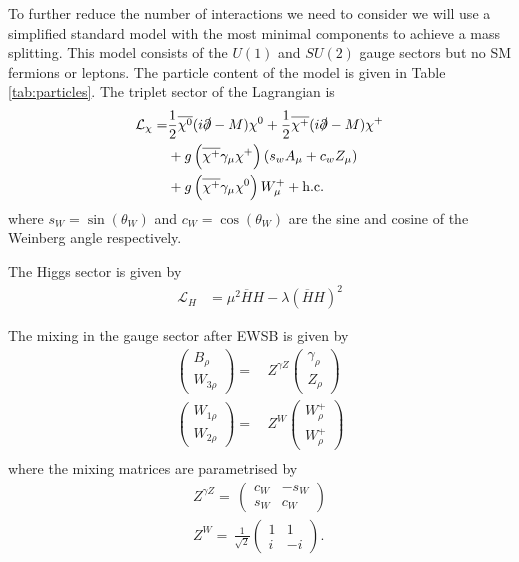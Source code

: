 \documentclass[11pt]{article}
\newcommand{\mychi}{\raisebox{0pt}[1ex][1ex]{$\chi$}}
\begin{document}
To further reduce the number of interactions we need to consider we will use a simplified standard model with the most minimal components to achieve a mass splitting.  This model consists of the $U(1)$ and $SU(2)$ gauge sectors but no SM fermions or leptons.  The particle content of the model is given in Table \ref{tab:particles}.  The triplet sector of the Lagrangian is
\begin{align}
\begin{split}
\mathcal{L}_{\chi}=&\frac{1}{2}\overline{\mychi^0}(i\slashed{\partial}-M)\mychi^0+\frac{1}{2}\overline{\mychi^+}(i\slashed{\partial}-M)\mychi^{+}\\
&+g\left(\overline{\mychi^+}\gamma_{\mu}\mychi^+\right)\left(s_wA_{\mu}+c_wZ_{\mu}\right)\\
&+g\left(\overline{\mychi^+}\gamma_{\mu}\mychi^0 \right)W_{\mu}^++\text{h.c.}
\end{split}
\end{align}
where $s_W=\sin(\theta_W)$ and $c_W=\cos(\theta_W)$ are the sine and cosine of the Weinberg angle respectively.

The Higgs sector is given by
\begin{align}
\mathcal{L}_{H}&=\mu^2 \overline{H}H-\lambda(\overline{H}H)^2
\end{align}

The mixing in the gauge sector after EWSB is given by
\begin{align} 
\left(\begin{array}{c} 
B_{{\rho}}\\ 
W_{{3 \rho}}\end{array} \right) 
 = & \,Z^{\gamma Z}
\left(\begin{array}{c} 
\gamma_{{\rho}}\\ 
Z_{{\rho}}\end{array} \right) \\ 
\left(\begin{array}{c} 
W_{{1 \rho}}\\ 
W_{{2 \rho}}\end{array} \right) 
 = & \,Z^{W}
\left(\begin{array}{c} 
W^+_{{\rho}}\\ 
W^+_{{\rho}}\end{array} \right) \\ 
\end{align} 
where the mixing matrices are parametrised by \\ 
\begin{align} 
Z^{\gamma Z}= \, \left( 
\begin{array}{cc} 
c_W  & - s_W   \\ 
 s_W  & c_W \end{array} 
\right) \\ 
Z^{W}= \,\frac{1}{\sqrt{2}}  \left( 
\begin{array}{cc} 
1& 1 \\ 
 i   & -i  \end{array} 
\right). \\ 
\end{align} 
\end{document}
